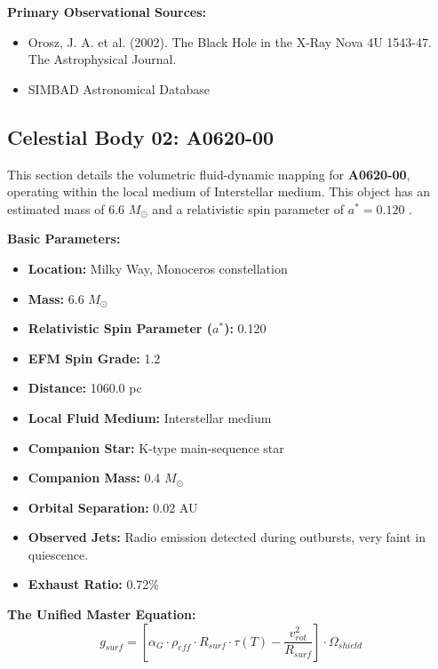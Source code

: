 \documentclass[11pt, a4paper]{article}
\begin{document}
\noindent \textbf{Primary Observational Sources:}
\begin{itemize}
  \item Orosz, J. A. et al. (2002). The Black Hole in the X-Ray Nova 4U 1543-47. The Astrophysical Journal. \cite{orosz2002}
  \item SIMBAD Astronomical Database \cite{simbad}
\end{itemize}

\clearpage
\subsection{Celestial Body 02: A0620-00}
This section details the volumetric fluid-dynamic mapping for \textbf{A0620-00}, operating within the local medium of Interstellar medium. This object has an estimated mass of 6.6 $M_{\odot}$ and a relativistic spin parameter of $a^* = 0.120$ \cite{cantrell2010, simbad}.

\vspace{0.5em}
\noindent \textbf{Basic Parameters:}
\begin{itemize}
  \item \textbf{Location:} Milky Way, Monoceros constellation
  \item \textbf{Mass:} 6.6 $M_{\odot}$
  \item \textbf{Relativistic Spin Parameter ($a^*$):} 0.120
  \item \textbf{EFM Spin Grade:} 1.2
  \item \textbf{Distance:} 1060.0 pc
  \item \textbf{Local Fluid Medium:} Interstellar medium
  \item \textbf{Companion Star:} K-type main-sequence star
  \item \textbf{Companion Mass:} 0.4 $M_{\odot}$
  \item \textbf{Orbital Separation:} 0.02 AU
  \item \textbf{Observed Jets:} Radio emission detected during outbursts, very faint in quiescence.
  \item \textbf{Exhaust Ratio:} 0.72\%
\end{itemize}

\vspace{0.5em}
\noindent \textbf{The Unified Master Equation:}
$$ g_{surf} = \left[ \alpha_G \cdot \rho_{eff} \cdot R_{surf} \cdot \tau(T) - \frac{v_{rot}^2}{R_{surf}} \right] \cdot \Omega_{shield} $$
\end{document}
